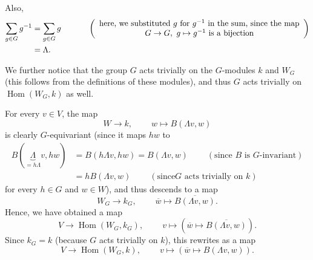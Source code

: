 \documentclass[etingof-lie.tex]{subfiles}
\begin{document}
Also,%
\begin{align*}
\sum\limits_{g\in G}g^{-1}  &  =\sum\limits_{g\in G}%
g\ \ \ \ \ \ \ \ \ \ \left(
\begin{array}
[c]{c}%
\text{here, we substituted }g\text{ for }g^{-1}\text{ in the sum, since the
map}\\
G\rightarrow G,\ g\mapsto g^{-1}\text{ is a bijection}%
\end{array}
\right) \\
&  =\Lambda.
\end{align*}


We further notice that the group $G$ acts trivially on the $G$-modules $k$ and
$W_{G}$ (this follows from the definitions of these modules), and thus $G$
acts trivially on $\operatorname*{Hom}\left(  W_{G},k\right)  $ as well.

For every $v\in V$, the map%
\[
W\rightarrow k,\ \ \ \ \ \ \ \ \ \ w\mapsto B\left(  \Lambda v,w\right)
\]
is clearly $G$-equivariant (since it maps $hw$ to%
\begin{align*}
B\left(  \underbrace{\Lambda}_{=h\Lambda}v,hw\right)   &  =B\left(  h\Lambda
v,hw\right)  =B\left(  \Lambda v,w\right)  \ \ \ \ \ \ \ \ \ \ \left(
\text{since }B\text{ is }G\text{-invariant}\right) \\
&  =hB\left(  \Lambda v,w\right)  \ \ \ \ \ \ \ \ \ \ \left(  \text{since
}G\text{ acts trivially on }k\right)
\end{align*}
for every $h\in G$ and $w\in W$), and thus descends to a map%
\[
W_{G}\rightarrow k_{G},\ \ \ \ \ \ \ \ \ \ \overline{w}\mapsto\overline
{B\left(  \Lambda v,w\right)  }.
\]
Hence, we have obtained a map%
\[
V\rightarrow\operatorname*{Hom}\left(  W_{G},k_{G}\right)
,\ \ \ \ \ \ \ \ \ \ v\mapsto\left(  \overline{w}\mapsto\overline{B\left(
\Lambda v,w\right)  }\right)  .
\]
Since $k_{G}=k$ (because $G$ acts trivially on $k$), this rewrites as a map%
\[
V\rightarrow\operatorname*{Hom}\left(  W_{G},k\right)
,\ \ \ \ \ \ \ \ \ \ v\mapsto\left(  \overline{w}\mapsto B\left(  \Lambda
v,w\right)  \right)  .
\]
\end{document}
